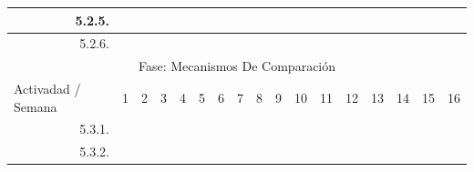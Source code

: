 \documentclass[12pt]{article}
\begin{document}
\begin{table}[H]
{\begin{tabular}{|rllllllllllllllll|}
        \multicolumn{1}{|r|}{5.2.5.} & \multicolumn{1}{l|}{} & \multicolumn{1}{l|}{} & \multicolumn{1}{l|}{} & \multicolumn{1}{c|}{\cellcolor[HTML]{B6D7A8}} & \multicolumn{1}{c|}{\cellcolor[HTML]{A4C2F4}} & \multicolumn{1}{c|}{\cellcolor[HTML]{A4C2F4}} & \multicolumn{1}{c|}{\cellcolor[HTML]{A4C2F4}} & \multicolumn{1}{l|}{} & \multicolumn{1}{l|}{} & \multicolumn{1}{l|}{} & \multicolumn{1}{l|}{} & \multicolumn{1}{l|}{} & \multicolumn{1}{l|}{} & \multicolumn{1}{l|}{} & \multicolumn{1}{l|}{} &  \\ \hline
        \multicolumn{1}{|r|}{5.2.6.} & \multicolumn{1}{l|}{} & \multicolumn{1}{l|}{} & \multicolumn{1}{l|}{} & \multicolumn{1}{l|}{} & \multicolumn{1}{l|}{} & \multicolumn{1}{l|}{} & \multicolumn{1}{c|}{\cellcolor[HTML]{A4C2F4}} & \multicolumn{1}{l|}{} & \multicolumn{1}{l|}{} & \multicolumn{1}{l|}{} & \multicolumn{1}{l|}{} & \multicolumn{1}{l|}{} & \multicolumn{1}{l|}{} & \multicolumn{1}{l|}{} & \multicolumn{1}{l|}{} &  \\ \hline
        \multicolumn{17}{|c|}{\cellcolor[HTML]{D9D9D9}Fase: Mecanismos De Comparación} \\ \hline
        \multicolumn{1}{|l|}{\cellcolor[HTML]{D9D9D9}Activadad / Semana} & \multicolumn{1}{c|}{\cellcolor[HTML]{B6D7A8}1} & \multicolumn{1}{c|}{\cellcolor[HTML]{B6D7A8}2} & \multicolumn{1}{c|}{\cellcolor[HTML]{B6D7A8}3} & \multicolumn{1}{c|}{\cellcolor[HTML]{B6D7A8}4} & \multicolumn{1}{c|}{\cellcolor[HTML]{A4C2F4}5} & \multicolumn{1}{c|}{\cellcolor[HTML]{A4C2F4}6} & \multicolumn{1}{c|}{\cellcolor[HTML]{A4C2F4}7} & \multicolumn{1}{c|}{\cellcolor[HTML]{A4C2F4}8} & \multicolumn{1}{c|}{\cellcolor[HTML]{B4A7D6}9} & \multicolumn{1}{c|}{\cellcolor[HTML]{B4A7D6}10} & \multicolumn{1}{c|}{\cellcolor[HTML]{B4A7D6}11} & \multicolumn{1}{c|}{\cellcolor[HTML]{B4A7D6}12} & \multicolumn{1}{c|}{\cellcolor[HTML]{EA9999}13} & \multicolumn{1}{c|}{\cellcolor[HTML]{EA9999}14} & \multicolumn{1}{c|}{\cellcolor[HTML]{EA9999}15} & \multicolumn{1}{c|}{\cellcolor[HTML]{EA9999}16} \\ \hline
        \multicolumn{1}{|r|}{5.3.1.} & \multicolumn{1}{l|}{} & \multicolumn{1}{l|}{} & \multicolumn{1}{l|}{} & \multicolumn{1}{l|}{} & \multicolumn{1}{l|}{} & \multicolumn{1}{l|}{} & \multicolumn{1}{c|}{\cellcolor[HTML]{A4C2F4}} & \multicolumn{1}{l|}{} & \multicolumn{1}{l|}{} & \multicolumn{1}{l|}{} & \multicolumn{1}{l|}{} & \multicolumn{1}{l|}{} & \multicolumn{1}{l|}{} & \multicolumn{1}{l|}{} & \multicolumn{1}{l|}{} &  \\ \hline
        \multicolumn{1}{|r|}{5.3.2.} & \multicolumn{1}{l|}{} & \multicolumn{1}{l|}{} & \multicolumn{1}{l|}{} & \multicolumn{1}{l|}{} & \multicolumn{1}{l|}{} & \multicolumn{1}{l|}{} & \multicolumn{1}{c|}{\cellcolor[HTML]{A4C2F4}} & \multicolumn{1}{c|}{\cellcolor[HTML]{A4C2F4}} & \multicolumn{1}{c|}{\cellcolor[HTML]{A4C2F4}} & \multicolumn{1}{l|}{} & \multicolumn{1}{l|}{} & \multicolumn{1}{l|}{} & \multicolumn{1}{l|}{} & \multicolumn{1}{l|}{} & \multicolumn{1}{l|}{} &  \\ \hline

\end{tabular}}
\end{table}
\end{document}
